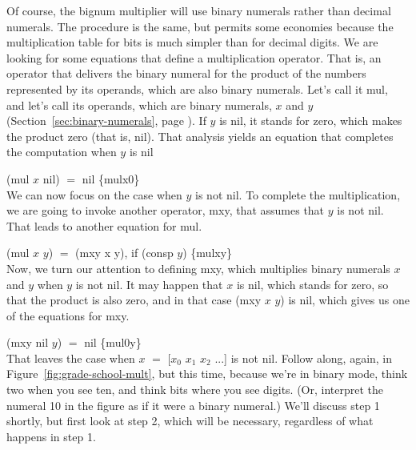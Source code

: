 Of course, the bignum multiplier
will use binary numerals rather than decimal numerals.
The procedure is the same, but permits some economies
because the multiplication table for bits is much simpler
than for decimal digits.
We are looking for some equations that define a multiplication operator.
That is, an operator that delivers the binary numeral for the product of the numbers
represented by its operands, which are also binary numerals.
Let's call it \textsf{mul}, and let's call its operands, which are binary numerals,
$x$ and $y$ (Section~\ref{sec:binary-numerals}, page \pageref{sec:binary-numerals}).
If $y$ is nil, it stands for zero,
which makes the product zero (that is, \textsf{nil}).
That analysis yields an equation that completes
the computation when $y$ is \textsf{nil}

\vspace{2mm}\hspace*{2cm} \textsf{(mul $x$ nil)} $=$ \textsf{nil} \hspace{2cm} \hfill \{mulx0\}\\

We can now focus on the case when $y$ is not \textsf{nil}.
To complete the multiplication,
we are going to invoke another operator, \textsf{mxy},
that assumes that $y$ is not \textsf{nil}.
That leads to another equation for \textsf{mul}.

\vspace{2mm}\hspace*{2cm} \textsf{(mul $x$ $y$)} $=$ \textsf{(mxy x y)}, if \textsf{(consp $y$)} \hfill \{mulxy\}\\

Now, we turn our attention to defining \textsf{mxy}, which multiplies binary
numerals $x$ and $y$ when $y$ is not \textsf{nil}.
It may happen that $x$ is \textsf{nil}, which stands for zero, so that
the product is also zero, and in that case \textsf{(mxy $x$ $y$)} is \textsf{nil},
which gives us one of the equations for \textsf{mxy}.

\vspace{2mm}\hspace*{2cm} \textsf{(mxy nil $y$)} $=$ \textsf{nil}  \hfill \{mul0y\}\\

That leaves the case when $x$ $=$ \textsf{[$x_0$ $x_1$ $x_2$ ...]} is not \textsf{nil}.
Follow along, again, in Figure~\ref{fig:grade-school-mult},
but this time, because we're in binary mode, think two when you see ten,
and think bits where you see digits. (Or, interpret the numeral 10
in the figure as if it were a binary numeral.)
We'll discuss step 1 shortly, but first look at step 2,
which will be necessary, regardless of what happens in step 1.

